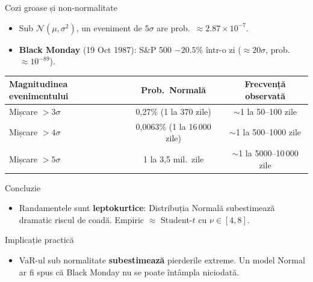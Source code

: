 \documentclass[9pt, aspectratio=169, t]{beamer}
\theoremstyle{definition}
\begin{document}
\begin{frame}[shrink=10]{Cozi groase și non-normalitate}
\begin{itemize}\footnotesize\setlength{\itemsep}{0pt}
    \item Sub $\mathcal{N}(\mu,\sigma^2)$, un eveniment de $5\sigma$ are prob.\ $\approx 2.87 \times 10^{-7}$.
    \item \textbf{Black Monday} (19 Oct 1987): S\&P 500 $-20.5\%$ într-o zi ($\approx 20\sigma$, prob.\ $\approx 10^{-89}$).
\end{itemize}
\vspace{0.05cm}
\begin{center}
{\footnotesize
\renewcommand{\arraystretch}{1.05}
\begin{tabular}{lcc}
\toprule
\textbf{Magnitudinea evenimentului} & \textbf{Prob.\ Normală} & \textbf{Frecvență observată} \\
\midrule
Mișcare $> 3\sigma$ & 0,27\% (1 la 370 zile) & $\sim$1 la 50--100 zile \\
Mișcare $> 4\sigma$ & 0,0063\% (1 la 16\,000 zile) & $\sim$1 la 500--1000 zile \\
Mișcare $> 5\sigma$ & 1 la 3,5 mil.\ zile & $\sim$1 la 5000--10\,000 zile \\
\bottomrule
\end{tabular}
}
\end{center}
\vspace{0.05cm}
\begin{alertblock}{Concluzie}
\begin{itemize}\small\setlength{\itemsep}{0pt}
    \item Randamentele sunt \textbf{leptokurtice}: Distribuția Normală subestimează dramatic riscul de coadă. Empiric $\approx$ Student-$t$ cu $\nu \in [4,8]$.
\end{itemize}
\end{alertblock}
\begin{exampleblock}{Implicație practică}
\begin{itemize}\small\setlength{\itemsep}{0pt}
    \item VaR-ul sub normalitate \textbf{subestimează} pierderile extreme. Un model Normal ar fi spus că Black Monday nu se poate întâmpla niciodată.
\end{itemize}
\end{exampleblock}
\end{frame}
\end{document}
